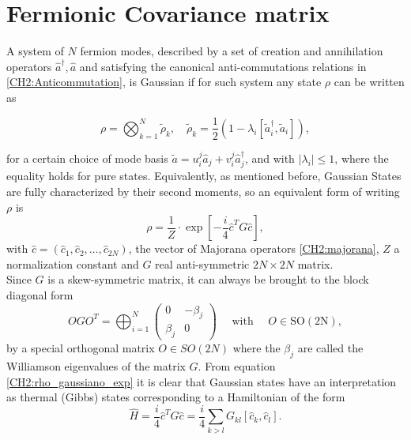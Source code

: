 \section{Fermionic Covariance matrix }
A system of $N$ fermion modes, described by a set of creation and annihilation operators $\hat{a}^{\dagger}, \hat{a}$  and satisfying the  canonical anti-commutations relations in \eqref{CH2:Anticommutation}, is Gaussian if for such system any state $\rho$ can be written as  \cite{cheong_many-body_2003}

\begin{equation}
\rho=\bigotimes_{k=1}^{N} \tilde{\rho}_{k}, \quad \tilde{\rho}_{k}=\frac{1}{2}\left(1-\lambda_{i}\left[\tilde{a}_{i}^{\dagger}, \tilde{a}_{i}\right]\right),
\label{CH2:rho_gaussiano_no_exp}
\end{equation}

for a certain choice of mode basis $\tilde{a}=u_{i}^{j}\hat{a}_{j} + v_{i}^{j}\hat{a}_{j}^{\dagger}$, and with $|\lambda_i|\leq 1$, where the equality holds for pure states. Equivalently, as mentioned before, Gaussian States are fully characterized by their second moments, so an equivalent form of writing $\rho$ is
\begin{equation}
\rho= \frac{1}{Z}\cdot \exp \left[-\frac{i}{4} \hat{c}^{T} G \hat{c}\right],
\label{CH2:rho_gaussiano_exp}
\end{equation}
with $\hat{c} = (\hat{c}_1,\hat{c}_2,\ldots,\hat{c}_{2N})$, the vector of Majorana operators \eqref{CH2:majorana}, $Z$ a normalization constant and $G$ real anti-symmetric $2N\times 2N$ matrix. 
\\
Since $G$ is a skew-symmetric matrix, it can always be brought to the block diagonal form 
\begin{equation}
O G O^{T}=\bigoplus_{i=1}^{N}\left(\begin{array}{cc}
0 & -\beta_{j} \\
\beta_{j} & 0
\end{array}\right) \quad \text { with } \quad O \in \mathrm{SO}(2 \mathrm{N}),
\label{CH2:MatrixG_Williamson}
\end{equation}
by a special orthogonal matrix $O\in SO(2N)$ where the $\beta_{j}$ are called the Williamson eigenvalues of the matrix $G$. 
From equation \eqref{CH2:rho_gaussiano_exp} it is clear that Gaussian states have an interpretation as thermal (Gibbs) states corresponding to a Hamiltonian of the form
\begin{equation}
\hat{H}=\frac{i}{4} \hat{c}^{T}G\hat{c}= \frac{i}{4} \sum_{k>l}G_{kl}\left[\hat{c}_{k},\hat{c}_{l}\right].
\label{CH2:Hamiltonian_majorana}
\end{equation}

